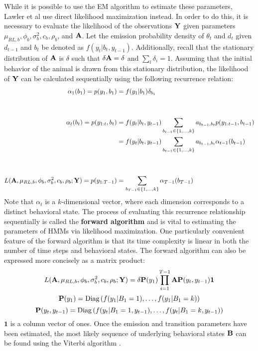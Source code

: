 While it is possible to use the EM algorithm to estimate these parameters, Lawler et al use direct likelihood maximization instead. In order to do this, it is necessary to evaluate the likelihood of the observations $\mathbf{Y}$ given parameters $\mu_{RL,b}, \phi_b, \sigma_b^2, c_b, \rho_b$, and $\mathbf{A}$. Let the emission probability density of $\theta_t$ and $d_t$ given $d_{t-1}$ and $b_t$ be denoted as $f(y_t|b_t,y_{t-1})$. Additionally, recall that the stationary distribution of $\mathbf{A}$ is $\delta$ such that $\delta \mathbf{A} = \delta$ and $\sum_i \delta_i = 1$. Assuming that the initial behavior of the animal is drawn from this stationary distribution, the likelihood of $\mathbf{Y}$ can be calculated sequentially using the following recurrence relation:
%
\begin{align*}
	\alpha_1(b_1) = p(y_1,b_1) &= f(y_1|b_1)\delta_{b_1} \\\\\\
	\alpha_t(b_t) = p(y_{1:t},b_t) &= f(y_t|b_t,y_{t-1})\sum_{b_{t-1} \in \{1,\ldots,k\}}a_{b_{t-1},b_t}p(y_{1:t-1},b_{t-1}) \\
	&= f(y_t|b_t,y_{t-1})\sum_{b_{t-1} \in \{1,\ldots,k\}}a_{b_{t-1},b_t} \alpha_{t-1}(b_{t-1}) \\\\\\
	L(\mathbf{A},\mu_{RL,b},\phi_b,\sigma_b^2,c_b,\rho_b; \mathbf{Y}) = p(y_{1:T-1}) &= \sum_{b_{T-1} \in \{1,\ldots,k\}} \alpha_{T-1}(b_{T-1}) 
\end{align*}	
%
Note that $\alpha_t$ is a $k$-dimensional vector, where each dimension corresponds to a distinct behavioral state. The process of evaluating this recurrence relationship sequentially is called the \textbf{forward algorithm} and is vital to estimating the parameters of HMMs via likelihood maximization. One particularly convenient feature of the forward algorithm is that its time complexity is linear in both the number of time steps and behavioral states. The forward algorithm can also be expressed more concisely as a matrix product:
%
$$L(\mathbf{A},\mu_{RL,b},\phi_b,\sigma_b^2,c_b,\rho_b; \mathbf{Y}) = \delta \mathbf{P}(y_1) \prod_{i=1}^{T-1} \mathbf{A} \mathbf{P}(y_t,y_{t-1}) \mathbf{1}$$
$$\mathbf{P}(y_1) = \text{Diag}\left( f(y_1|B_1 = 1), \ldots, f(y_1|B_1 = k) \right)$$
$$\mathbf{P}(y_t,y_{t-1}) = \text{Diag}\left( f(y_t|B_1 = 1, y_{t-1}), \ldots, f(y_t|B_1 = k, y_{t-1}) \right)$$
%
$\mathbf{1}$ is a column vector of ones. Once the emission and transition parameters have been estimated, the most likely sequence of underlying behavioral states $\mathbf{B}$ can be found using the Viterbi algorithm \cite{Viterbi:1967}.

